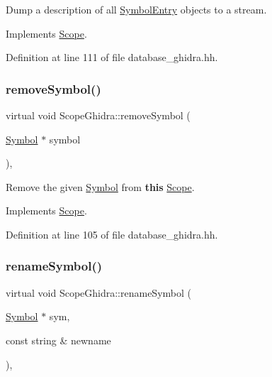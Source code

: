 Dump a description of all \mbox{\hyperlink{class_symbol_entry}{Symbol\+Entry}} objects to a stream. 



Implements \mbox{\hyperlink{class_scope_a7d67a1b9e60078023b508dd3cbe4447d}{Scope}}.



Definition at line 111 of file database\+\_\+ghidra.\+hh.

\mbox{\label{class_scope_ghidra_af54aaf6bcabc70b6b705fd1b49ecd720}} 
\subsubsection{\texorpdfstring{removeSymbol()}{removeSymbol()}}
{\footnotesize\ttfamily virtual void Scope\+Ghidra\+::remove\+Symbol (\begin{DoxyParamCaption}\item[{\mbox{\hyperlink{class_symbol}{Symbol}} $\ast$}]{symbol }\end{DoxyParamCaption})\hspace{0.3cm}{\ttfamily [inline]}, {\ttfamily [virtual]}}



Remove the given \mbox{\hyperlink{class_symbol}{Symbol}} from {\bfseries{this}} \mbox{\hyperlink{class_scope}{Scope}}. 



Implements \mbox{\hyperlink{class_scope_a0172591847f6a1b338ad324f28732f7f}{Scope}}.



Definition at line 105 of file database\+\_\+ghidra.\+hh.

\mbox{\label{class_scope_ghidra_af6476f25701e4bc419644bab003d5513}} 
\subsubsection{\texorpdfstring{renameSymbol()}{renameSymbol()}}
{\footnotesize\ttfamily virtual void Scope\+Ghidra\+::rename\+Symbol (\begin{DoxyParamCaption}\item[{\mbox{\hyperlink{class_symbol}{Symbol}} $\ast$}]{sym,  }\item[{const string \&}]{newname }\end{DoxyParamCaption})\hspace{0.3cm}{\ttfamily [inline]}, {\ttfamily [virtual]}}



